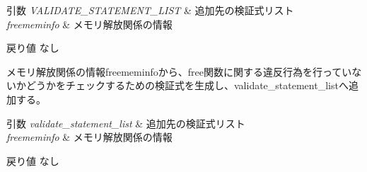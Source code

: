 \begin{DoxyParams}{引数}
{\em VALIDATE\_\-STATEMENT\_\-LIST} & 追加先の検証式リスト \\
\hline
{\em freememinfo} & メモリ解放関係の情報\\
\hline
\end{DoxyParams}
\begin{DoxyReturn}{戻り値}
なし
\end{DoxyReturn}
メモリ解放関係の情報freememinfoから、free関数に関する違反行為を行っていないかどうかをチェックするための検証式を生成し、validate\_\-statement\_\-listへ追加する。


\begin{DoxyParams}{引数}
{\em validate\_\-statement\_\-list} & 追加先の検証式リスト \\
\hline
{\em freememinfo} & メモリ解放関係の情報\\
\hline
\end{DoxyParams}
\begin{DoxyReturn}{戻り値}
なし 
\end{DoxyReturn}
